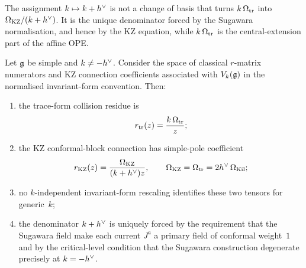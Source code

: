 The assignment $k \mapsto k + h^{\vee}$ is not a change of basis that turns
$k\,\Omega_{\mathrm{tr}}$ into $\Omega_{\mathrm{KZ}}/(k+h^{\vee})$. It is the unique denominator
forced by the Sugawara normalisation, and hence by the KZ equation,
while $k\,\Omega_{\mathrm{tr}}$ is the central-extension part of the affine OPE.

\begin{theorem}
\label{thm:level-shift-universality}
\ClaimStatusProvedHere
Let $\mathfrak{g}$ be simple and $k \neq -h^{\vee}$. Consider the space of classical
$r$-matrix numerators and KZ connection coefficients associated with
$V_k(\mathfrak{g})$ in the normalised invariant-form convention. Then:
\begin{enumerate}[label=\textup{(\roman*)}]
\item the trace-form collision residue is
\[
 r_{\mathrm{tr}}(z)=\frac{k\,\Omega_{\mathrm{tr}}}{z};
\]
\item the KZ conformal-block connection has simple-pole coefficient
\[
 r_{\mathrm{KZ}}(z)=\frac{\Omega_{\mathrm{KZ}}}{(k+h^{\vee})z},
 \qquad \Omega_{\mathrm{KZ}}=\Omega_{\mathrm{tr}}=2h^{\vee}\,\Omega_{\mathrm{Kil}};
\]
\item no $k$-independent invariant-form rescaling identifies these two
 tensors for generic~$k$;
\item the denominator $k+h^{\vee}$ is uniquely forced by the requirement that
 the Sugawara field make each current $J^a$ a primary field of
 conformal weight~$1$ and by the critical-level condition that the
 Sugawara construction degenerate precisely at $k=-h^{\vee}$.
\end{enumerate}
\end{theorem}

